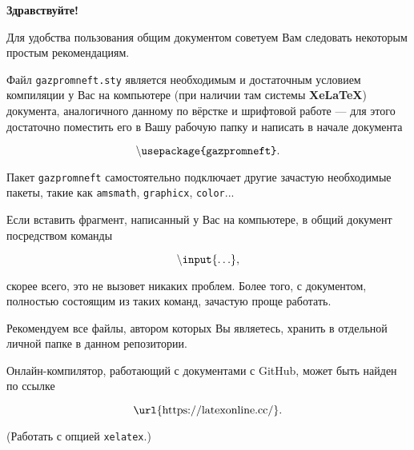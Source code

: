 \documentclass[12pt,a4paper,report]{ncc}
\begin{document}


{\bf\Large\noindent Здравствуйте!}

\medskip\ms Для удобства пользования общим документом советуем Вам следовать некоторым простым рекомендациям.

\ms Файл {\tt gazpromneft.sty} является необходимым и достаточным условием компиляции у Вас на компьютере (при наличии там системы {\bf Xe\LaTeX}) документа, аналогичного данному по вёрстке и шрифтовой работе — для этого достаточно поместить его в Вашу рабочую папку и написать в начале документа

$$\backslash\text{\tt usepackage\{gazpromneft\}}.$$

\ms Пакет {\tt gazpromneft} самостоятельно подключает другие зачастую необходимые пакеты, такие как {\tt amsmath}, {\tt graphicx}, {\tt color}...

\ms Если вставить фрагмент, написанный у Вас на компьютере, в общий документ посредством команды

$$\backslash{\tt input\{.\,.\,.\}},$$

\ms скорее всего, это не вызовет никаких проблем. Более того, с документом, полностью состоящим из таких команд, зачастую проще работать.

\ms Рекомендуем все файлы, автором которых Вы являетесь, хранить в отдельной личной папке в данном репозитории.

\ms Онлайн-компилятор, работающий с документами с GitHub, может быть найден по ссылке

$$\text{\url{https://latexonline.cc/}}.$$

\ms (Работать с опцией {\tt xelatex}.)
\end{document}
